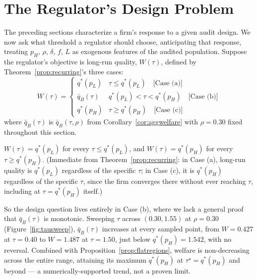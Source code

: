 \section{The Regulator's Design Problem}
\label{sec:regulator}

The preceding sections characterize a firm's response to a given audit design. We now ask what threshold a regulator should choose, anticipating that response, treating $p_H$, $\rho$, $\delta$, $f$, $L$ as exogenous features of the audited population. Suppose the regulator's objective is long-run quality, $W(\tau)$, defined by Theorem~\ref{prop:recurring}'s three cases:
\begin{equation}
W(\tau) =
\begin{cases}
q^*(p_L) & \tau \leq q^*(p_L) \quad \text{[Case (a)]} \\
\bar{q}_B(\tau) & q^*(p_L) < \tau < q^*(p_H) \quad \text{[Case (b)]} \\
q^*(p_H) & \tau \geq q^*(p_H) \quad \text{[Case (c)]}
\end{cases}
\label{eq:regulatorobjective}
\end{equation}
where $\bar{q}_B(\tau)$ is $\bar{q}_B(\tau,\rho)$ from Corollary~\ref{cor:aggwelfare} with $\rho=0.30$ fixed throughout this section.

\begin{proposition}
$W(\tau) = q^*(p_L)$ for every $\tau \leq q^*(p_L)$, and $W(\tau) = q^*(p_H)$ for every $\tau \geq q^*(p_H)$. (Immediate from Theorem~\ref{prop:recurring}: in Case (a), long-run quality is $q^*(p_L)$ regardless of the specific $\tau$; in Case (c), it is $q^*(p_H)$ regardless of the specific $\tau$, since the firm converges there without ever reaching $\tau$, including at $\tau=q^*(p_H)$ itself.)
\label{prop:flatregions}
\end{proposition}

So the design question lives entirely in Case (b), where we lack a general proof that $\bar{q}_B(\tau)$ is monotonic. Sweeping $\tau$ across $(0.30,1.55)$ at $\rho=0.30$ (Figure~\ref{fig:tausweep}), $\bar{q}_B(\tau)$ increases at every sampled point, from $W=0.427$ at $\tau=0.40$ to $W=1.487$ at $\tau=1.50$, just below $q^*(p_H)=1.542$, with no reversal. Combined with Proposition~\ref{prop:flatregions}, welfare is non-decreasing across the entire range, attaining its maximum $q^*(p_H)$ at $\tau^\star=q^*(p_H)$ and beyond — a numerically-supported trend, not a proven limit.

